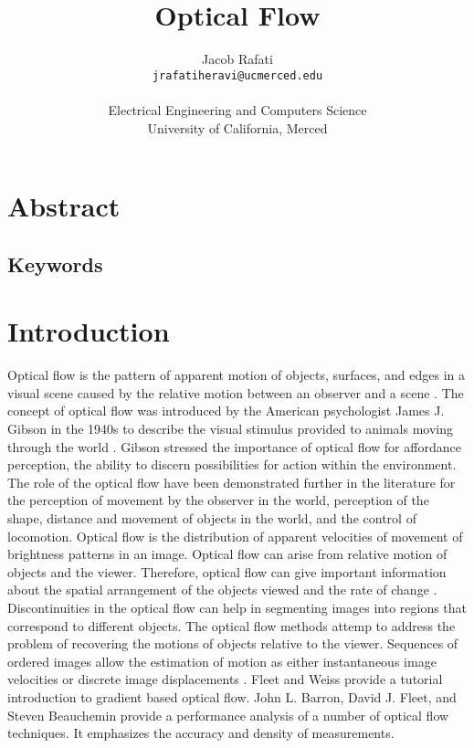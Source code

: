 \documentclass[letterpaper,12pt]{article}
\title{\Huge \textbf{Optical Flow}}
\author{
  \Large Jacob Rafati\\ \texttt{jrafatiheravi@ucmerced.edu}\\
  \\  Electrical Engineering and Computers Science\\  
   University of California, Merced
}
\begin{document}
\maketitle

\tableofcontents
\newpage
\section*{Abstract} 
\label{sec:abstract}

\subsection*{Keywords}
\newpage

\section{Introduction} 
\label{sec:introduction}
Optical flow is the pattern of apparent motion of objects, surfaces, and edges in a visual scene caused by the relative motion between an observer and a scene \citep{Horn:Schunck:1981}. The concept of optical flow was introduced by the American psychologist James J. Gibson in the 1940s to describe the visual stimulus provided to animals moving through the world \citep{Gibson:1979}. Gibson stressed the importance of optical flow for affordance perception, the ability to discern possibilities for action within the environment. The role of the optical flow have been demonstrated further in the literature for the perception of movement by the observer in the world, perception of the shape, distance and movement of objects in the world, and the control of locomotion. Optical flow is the distribution of apparent velocities of movement of brightness patterns in an image. Optical flow can arise from relative motion of objects and the viewer. Therefore, optical flow can give important information about the spatial arrangement of the objects viewed and the rate of change \citep{Horn:Schunck:1981}.  Discontinuities in the optical flow can help in segmenting images into regions that correspond to different objects. The optical flow methods attemp to address the problem of recovering the motions of objects relative to the viewer. 
Sequences of ordered images allow the estimation of motion as either instantaneous image velocities or discrete image displacements . Fleet and Weiss provide a tutorial introduction to gradient based optical flow. John L. Barron, David J. Fleet, and Steven Beauchemin provide a performance analysis of a number of optical flow techniques. It emphasizes the accuracy and density of measurements.
\end{document}
